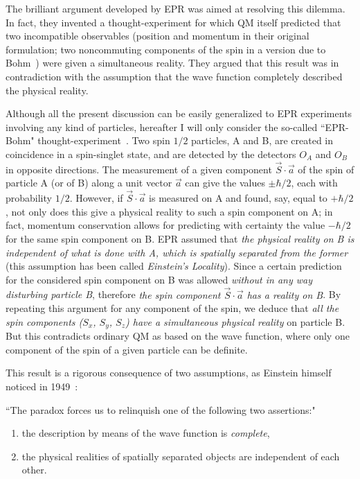 \documentclass[published]{JHEP3}
\begin{document}
The brilliant argument developed by EPR was aimed at resolving this
dilemma. In fact, they invented a thought-experiment for which QM
itself predicted that two incompatible observables (position and
momentum in their original formulation; two noncommuting components of
the spin in a version due to Bohm~\cite{Bohm}) were given a
simultaneous reality. They argued that this result was in
contradiction with the assumption that the wave function completely
described the physical reality.

Although all the present discussion can be easily generalized to EPR
experiments involving any kind of particles, hereafter I will only
consider the so-called ``EPR-Bohm"
thought-experiment~\cite{Bohm,pureprp}. Two spin $1/2$ particles, A
and B, are created in coincidence in a spin-singlet state, and are
detected by the detectors $O_A$ and $O_B$ in opposite directions. The
measurement of a given component $\vec S\cdot\vec a$ of the spin of
particle A (or of B) along a unit vector $\vec a$ can give the values
$\pm\hbar/2$, each with probability $1/2$. However, if $\vec
S\cdot\vec a$ is measured on A and found, say, equal to $+\hbar/2$,
not only does this give a physical reality to such a spin component on
A; in fact, momentum conservation allows for predicting with certainty
the value $-\hbar/2$ for the same spin component on B. EPR assumed
that \emph{the physical reality on B is independent of what is done
with A, which is spatially separated from the former} (this assumption
has been called \emph{Einstein's Locality}). Since a certain
prediction for the considered spin component on B was allowed
\emph{without in any way disturbing particle B}, therefore \emph{the
spin component $\vec S\cdot\vec a$ has a reality on B}. By repeating
this argument for any component of the spin, we deduce that \emph{all
the spin components ($S_x$, $S_y$, $S_z$) have a simultaneous physical
reality} on particle B.  But this contradicts ordinary QM as based on
the wave function, where only one component of the spin of a given
particle can be definite.

This result is a rigorous consequence of two assumptions, as Einstein
himself noticed in 1949~\cite{Einstein49}:

``The paradox forces us to relinquish one of the following two
assertions:"
\begin{enumerate} 
\item the description by means of the wave function is {\it
complete},

\item the physical realities of spatially separated objects are
independent of each other.
\end{enumerate}
\end{document}
